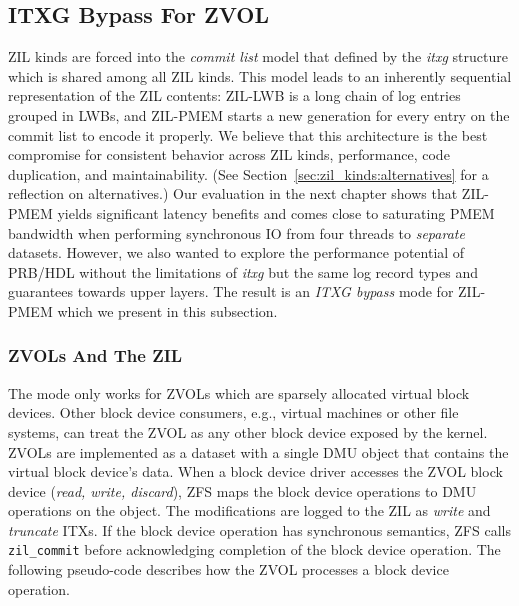 \documentclass[12pt,a4paper,twoside]{book}
\begin{document}
\subsection{ITXG Bypass For ZVOL}\label{sec:itxgbypass}
ZIL kinds are forced into the \textit{commit list} model that defined by the \textit{itxg} structure which is shared among all ZIL kinds.
This model leads to an inherently sequential representation of the ZIL contents:
ZIL-LWB is a long chain of log entries grouped in LWBs, and ZIL-PMEM starts a new generation for every entry on the commit list to encode it properly.
We believe that this architecture is the best compromise for consistent behavior across ZIL kinds, performance, code duplication, and maintainability.
(See Section~\ref{sec:zil_kinds:alternatives} for a reflection on alternatives.)
Our evaluation in the next chapter shows that ZIL-PMEM yields significant latency benefits and comes close to saturating PMEM bandwidth when performing synchronous IO from four threads to \textit{separate} datasets.
However, we also wanted to explore the performance potential of PRB/HDL without the limitations of \textit{itxg} but the same log record types and guarantees towards upper layers.
The result is an \textit{ITXG bypass} mode for ZIL-PMEM which we present in this subsection.

\subsubsection{ZVOLs And The ZIL}\label{sec:itxgbypass:openzfsbackground_zvols}
The mode only works for ZVOLs which are sparsely allocated virtual block devices.
Other block device consumers, e.g., virtual machines or other file systems, can treat the ZVOL as any other block device exposed by the kernel.
ZVOLs are implemented as a dataset with a single DMU object that contains the virtual block device's data.
When a block device driver accesses the ZVOL block device (\textit{read, write, discard}), ZFS maps the block device operations to DMU operations on the object.
The modifications are logged to the ZIL as \textit{write} and \textit{truncate} ITXs.
If the block device operation has synchronous semantics, ZFS calls \lstinline{zil_commit} before acknowledging completion of the block device operation.
The following pseudo-code describes how the ZVOL processes a block device operation.
\end{document}
